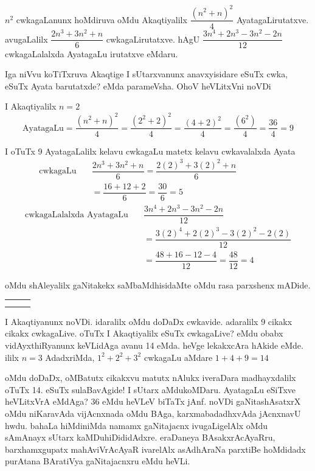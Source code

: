 $n^2$ cwkagaLanunx hoMdiruva oMdu Akaqtiyalilx $\dfrac{(n^2+n)^2}{4}$ Ayata\-gaLirutatxve.
avugaLalilx $\dfrac{2n^3+3n^2+n}{6}$ cwkagaLirutatxve. hAgU $\dfrac{3n^4+2n^3-3n^2-2n}{12}$
cwkagaLalalxda AyatagaLu irutatxve eMdaru. 

Iga niVvu koTiTxruva Akaqtige I sUtarxvanunx anavxyisidare eSuTx cwka, eSuTx Ayata barutatxde? eMda parameVsha. OhoV heVLitxVni noVDi

I Akaqtiyalilx $n=2$
$$
\text{AyatagaLu} =\dfrac{(n^2+n)^2}{4}=\dfrac{(2^2+2)^2}{4}=\dfrac{(4+2)^2}{4}=\dfrac{(6^2)}{4}=\dfrac{36}{4}=9
$$

I oTuTx {\rm 9} AyatagaLalilx kelavu cwkagaLu matetx kelavu cwkavalalxda Ayata
\begin{align*}
\text{cwkagaLu} \quad &\dfrac{2n^3+3n^2+n}{6}=\dfrac{2(2)^3+3(2)^2+n}{6} \hspace{2cm}\\[2pt]
& =\dfrac{16+12+2}{6}=\dfrac{30}{6}=5
\end{align*}
\begin{align*}
\text{cwkagaLalalxda AyatagaLu}
 \quad &\dfrac{3n^4+2n^3-3n^2-2n}{12} \hspace{2cm}\\[3pt]
&=\dfrac{3(2)^4+2(2)^3-3(2)^2-2(2)}{12}\\[3pt] 
 &=\dfrac{48+16-12-4}{12}=\dfrac{48}{12}=4
\end{align*}

oMdu shAleyalilx gaNitakekx saMbaMdhisidaMte oMdu rasa parxshenx mADide.
{\renewcommand{\arraystretch}{.5}
\tabcolsep=4.5pt
\begin{tabular}{|c|c|c|}
\hline
 & & \\
\hline
 & &\\
\hline
& &\\
\hline
\end{tabular}}


\medskip

I Akaqtiyanunx noVDi. idaralilx oMdu doDaDx cwkavide. adaralilx {\rm 9} cikakx cikakx cwkagaLive. oTuTx I Akaqtiyalilx eSuTx cwkagaLive? eMdu obabx vidAyxthiRyanunx keVLidAga avanu {\rm 14} eMda. heVge lekakxcAra hAkide eMde. ililx $n=3$ AdadxriMda, $1^2+2^2+3^2$ cwkagaLu aMdare $1+4+9=14$

\newpage

oMdu doDaDx, oMBatutx cikakxvu matutx nAlukx iveraDara madhayxdalilx oTuTx {\rm 14}. eSuTx sulaBavAgide! I sUtarx aMdukoMDaru. AyatagaLu eSiTxve heVLitxVrA eMdAga? {\rm 36} eMdu heVLeV biTaTx jAnf. noVDi gaNitashAsatxrX oMdu niKaravAda vijAcnxnada oMdu BAga, karxmabadadhxvAda jAcnxnavU hwdu. bahaLa hiMdiniMda namamx gaNitajacnx ivugaLigelAlx oMdu sAmAnayx sUtarx kaMDuhiDididAdxre. eraDaneya BAsakxrAcAyaRru, barxhamxgupatx mahAviVrAcAyaR ivarelAlx asAdhAraNa parxtiBe hoMdidadx purAtana BAratiVya gaNitajacnxru eMdu heVLi.

